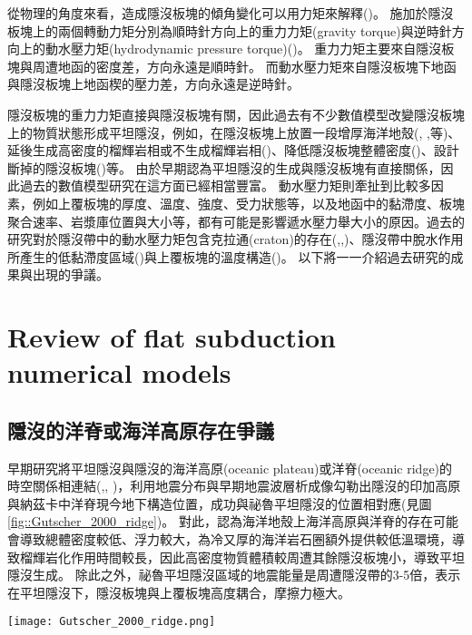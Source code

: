 從物理的角度來看，造成隱沒板塊的傾角變化可以用力矩來解釋(\citealp{stevenson1977angle})。
施加於隱沒板塊上的兩個轉動力矩分別為順時針方向上的重力力矩(gravity torque)與逆時針方向上的動水壓力矩(hydrodynamic pressure torque)(\citealp{McKenzie1969})。
重力力矩主要來自隱沒板塊與周遭地函的密度差，方向永遠是順時針。
而動水壓力矩來自隱沒板塊下地函與隱沒板塊上地函楔的壓力差，方向永遠是逆時針。

隱沒板塊的重力力矩直接與隱沒板塊有關，因此過去有不少數值模型改變隱沒板塊上的物質狀態形成平坦隱沒，例如，在隱沒板塊上放置一段增厚海洋地殼(\citealp{van2002role}, \citealp{Liu2016},\citealp{Hu2016}等)、延後生成高密度的榴輝岩相或不生成榴輝岩相(\citealp{van2002role})、降低隱沒板塊整體密度(\citealp{Gerya2009})、設計斷掉的隱沒板塊(\citealp{Liu2016})等。
由於早期認為平坦隱沒的生成與隱沒板塊有直接關係，因此過去的數值模型研究在這方面已經相當豐富。
動水壓力矩則牽扯到比較多因素，例如上覆板塊的厚度、溫度、強度、受力狀態等，以及地函中的黏滯度、板塊聚合速率、岩漿庫位置與大小等，都有可能是影響遞水壓力舉大小的原因。過去的研究對於隱沒帶中的動水壓力矩包含克拉通(craton)的存在(\citealp{Manea2012Chile},\citealp{Liu2016},\citealp{Hu2016})、隱沒帶中脫水作用所產生的低黏滯度區域(\citealp{Manea2007})與上覆板塊的溫度構造(\citealp{Thermal2012})。
以下將一一介紹過去研究的成果與出現的爭議。

\section{Review of flat subduction numerical models}
\subsection{隱沒的洋脊或海洋高原存在爭議}
早期研究將平坦隱沒與隱沒的海洋高原(oceanic plateau)或洋脊(oceanic ridge)的時空關係相連結(\citealp{pilger1981plate},\citealp{henderson1984mesozoic}, \citealp{Gutscher2000})，\citealp{Gutscher2000}利用地震分布與早期地震波層析成像勾勒出隱沒的印加高原與納茲卡中洋脊現今地下構造位置，成功與祕魯平坦隱沒的位置相對應(見圖\ref{fig::Gutscher_2000_ridge})。
對此，\citealp{Gutscher2000}認為海洋地殼上海洋高原與洋脊的存在可能會導致總體密度較低、浮力較大，為冷又厚的海洋岩石圈額外提供較低溫環境，導致榴輝岩化作用時間較長，因此高密度物質體積較周遭其餘隱沒板塊小，導致平坦隱沒生成。
除此之外，祕魯平坦隱沒區域的地震能量是周遭隱沒帶的3-5倍，表示在平坦隱沒下，隱沒板塊與上覆板塊高度耦合，摩擦力極大。
\begin{figure*}[ht!]
    \centering
    \texttt{[image: Gutscher\_2000\_ridge.png]}
    \caption{南美洲板塊構造圖，摘自\citealp{Gutscher2000}。粗支架線標出平坦隱沒段，灰色陰影區標示隱沒的海洋高原與洋脊，三角形為活動火山。板塊聚合速率參考自\citealp{demets1990current}。
    }
    \label{fig::Gutscher_2000_ridge}
\end{figure*}

